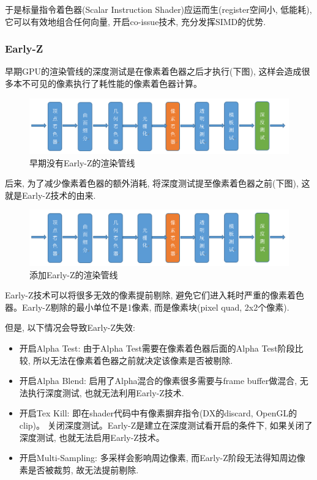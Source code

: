 \documentclass[UTF8]{ctexart}
\begin{document}
于是标量指令着色器(Scalar Instruction Shader)应运而生(register空间小, 低能耗), 它可以有效地组合任何向量, 开启co-issue技术, 充分发挥SIMD的优势.

\subsubsection{Early-Z}
早期GPU的渲染管线的深度测试是在像素着色器之后才执行(下图), 这样会造成很多本不可见的像素执行了耗性能的像素着色器计算。

\begin{figure}[H]
  \includegraphics[width=15cm]{early_z.png}
  \centering
  \caption{早期没有Early-Z的渲染管线}
  \label{fig:rendering-pipeline-without-early-z}
\end{figure}

后来, 为了减少像素着色器的额外消耗, 将深度测试提至像素着色器之前(下图), 这就是Early-Z技术的由来.
\begin{figure}[H]
  \includegraphics[width=15cm]{early_z.png}
  \centering
  \caption{添加Early-Z的渲染管线}
  \label{fig:rendering-pipeline-with-early-z}
\end{figure}

Early-Z技术可以将很多无效的像素提前剔除, 避免它们进入耗时严重的像素着色器。Early-Z剔除的最小单位不是1像素, 而是像素块(pixel quad, 2x2个像素).

  但是, 以下情况会导致Early-Z失效:
  \begin{itemize}
  \item 开启Alpha Test: 由于Alpha Test需要在像素着色器后面的Alpha Test阶段比较, 所以无法在像素着色器之前就决定该像素是否被剔除.

  \item 开启Alpha Blend: 启用了Alpha混合的像素很多需要与frame buffer做混合, 无法执行深度测试, 也就无法利用Early-Z技术.

  \item 开启Tex Kill: 即在shader代码中有像素摒弃指令(DX的discard, OpenGL的clip)。
  关闭深度测试。Early-Z是建立在深度测试看开启的条件下, 如果关闭了深度测试, 也就无法启用Early-Z技术。

  \item 开启Multi-Sampling: 多采样会影响周边像素, 而Early-Z阶段无法得知周边像素是否被裁剪, 故无法提前剔除.

  \end{itemize}
\end{document}
